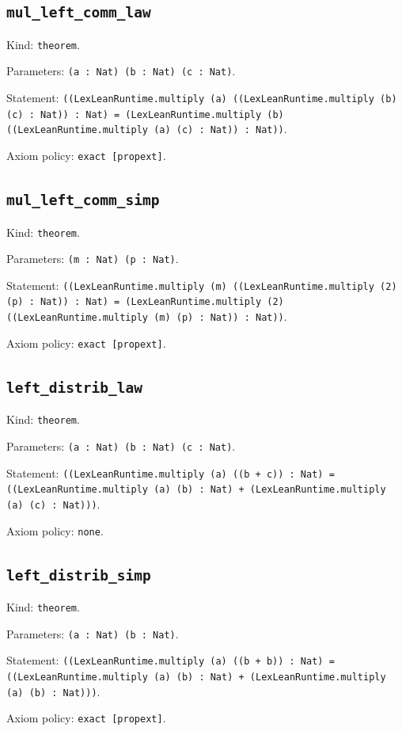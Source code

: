 \documentclass[11pt]{article}
\begin{document}
\subsection*{\texttt{mul\_left\_comm\_law}}
\noindent Kind: \texttt{theorem}.\par
\noindent Parameters: \texttt{(a : Nat) (b : Nat) (c : Nat)}.\par
\noindent Statement: \texttt{((LexLeanRuntime.multiply (a) ((LexLeanRuntime.multiply (b) (c) : Nat)) : Nat) = (LexLeanRuntime.multiply (b) ((LexLeanRuntime.multiply (a) (c) : Nat)) : Nat))}.\par
\noindent Axiom policy: \texttt{exact [propext]}.\par
\subsection*{\texttt{mul\_left\_comm\_simp}}
\noindent Kind: \texttt{theorem}.\par
\noindent Parameters: \texttt{(m : Nat) (p : Nat)}.\par
\noindent Statement: \texttt{((LexLeanRuntime.multiply (m) ((LexLeanRuntime.multiply (2) (p) : Nat)) : Nat) = (LexLeanRuntime.multiply (2) ((LexLeanRuntime.multiply (m) (p) : Nat)) : Nat))}.\par
\noindent Axiom policy: \texttt{exact [propext]}.\par
\subsection*{\texttt{left\_distrib\_law}}
\noindent Kind: \texttt{theorem}.\par
\noindent Parameters: \texttt{(a : Nat) (b : Nat) (c : Nat)}.\par
\noindent Statement: \texttt{((LexLeanRuntime.multiply (a) ((b + c)) : Nat) = ((LexLeanRuntime.multiply (a) (b) : Nat) + (LexLeanRuntime.multiply (a) (c) : Nat)))}.\par
\noindent Axiom policy: \texttt{none}.\par
\subsection*{\texttt{left\_distrib\_simp}}
\noindent Kind: \texttt{theorem}.\par
\noindent Parameters: \texttt{(a : Nat) (b : Nat)}.\par
\noindent Statement: \texttt{((LexLeanRuntime.multiply (a) ((b + b)) : Nat) = ((LexLeanRuntime.multiply (a) (b) : Nat) + (LexLeanRuntime.multiply (a) (b) : Nat)))}.\par
\noindent Axiom policy: \texttt{exact [propext]}.\par
\end{document}

